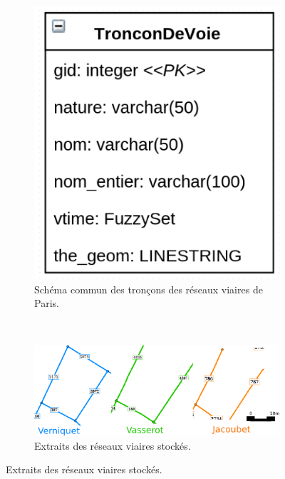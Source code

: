 \documentclass[a4paper,12pt]{article}
\begin{document}
\begin{figure}[H]
        \centering
        \begin{subfigure}[b]{0.3\textwidth}
                \includegraphics[width=\textwidth]{./images/schema_bd_tronc.png}
				\caption{Schéma commun des tronçons des réseaux viaires de Paris.}
                \label{fig:schema_aligne_tronçon}
        \end{subfigure}%
        \\
        \begin{subfigure}[b]{1\textwidth}
                \includegraphics[width=\textwidth]{./images/extract_tronc_3src.png}
				\caption{Extraits des réseaux viaires stockés.}
                \label{fig:extract_tronc}
        \end{subfigure}

\end{figure}
\end{document}
